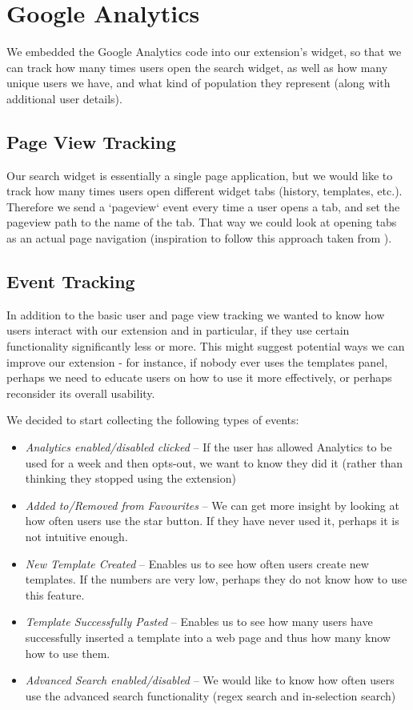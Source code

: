 \documentclass[bsc,frontabs,twoside,singlespacing,parskip,deptreport]{infthesis}
\providecommand{\tightlist}{%
  \setlength{\itemsep}{0pt}\setlength{\parskip}{0pt}}
\begin{document}
\section{Google Analytics}
We embedded the Google Analytics code into our extension's widget, so that we can track how many times users open the search widget, as well as how many unique users we have, and what kind of population they represent (along with additional user details).

\subsection{Page View Tracking}
Our search widget is essentially a single page application, but we would like to track how many times users open different widget tabs (history, templates, etc.). Therefore we send a `pageview` event every time a user opens a tab, and set the pageview path to the name of the tab. That way we could look at opening tabs as an actual page navigation (inspiration to follow this approach taken from \cite{A22}).

\subsection{Event Tracking}
In addition to the basic user and page view tracking we wanted to know how users interact with our extension and in particular, if they use certain functionality significantly less or more. This might suggest potential ways we can improve our extension - for instance, if nobody ever uses the templates panel, perhaps we need to educate users on how to use it more effectively, or perhaps reconsider its overall usability.

We decided to start collecting the following types of events:
\begin{itemize}
\tightlist
\item
  \textit{Analytics enabled/disabled clicked} -- If the user has allowed Analytics to be used for a week and then opts-out, we want to know they did it (rather than thinking they stopped using the extension)
\item
  \textit{Added to/Removed from Favourites} -- We can get more insight by looking at how often users use the star button. If they have never used it, perhaps it is not intuitive enough.
\item
  \textit{New Template Created} -- Enables us to see how often users create new templates. If the numbers are very low, perhaps they do not know how to use this feature.
\item
  \textit{Template Successfully Pasted} -- Enables us to see how many users have successfully inserted a template into a web page and thus how many know how to use them.
\item
  \textit{Advanced Search enabled/disabled} -- We would like to know how often users use the advanced search functionality (regex search and in-selection search)
\end{itemize}
\end{document}
